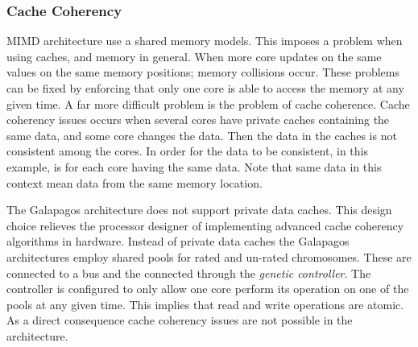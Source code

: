 \subsubsection{Cache Coherency}
MIMD architecture use a shared memory models.
This imposes a problem when using caches, and memory in general.
When more core updates on the same values on the same memory positions; memory collisions occur.
These problems can be fixed by enforcing that only one core is able to access the memory at any given time.
A far more difficult problem is the problem of cache coherence.
Cache coherency issues occurs when several cores have private caches containing the same data, and some core changes the data.
Then the data in the caches is not consistent among the cores.
In order for the data to be consistent, in this example, is for each core having the same data.
Note that same data in this context mean data from the same memory location.


The Galapagos architecture does not support private data caches.
This design choice relieves the processor designer of implementing advanced cache coherency algorithms in hardware.
Instead of private data caches the Galapagos architectures employ shared pools for rated and un-rated chromosomes.
These are connected to a bus and the connected through the \emph{genetic controller}.
The controller is configured to only allow one core perform its operation on one of the pools at any given time.
This implies that read and write operations are atomic.
As a direct consequence cache coherency issues are not possible in the architecture.
